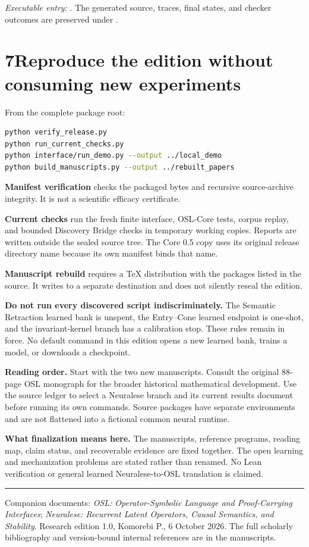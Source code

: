 \documentclass[11pt]{article}
\begin{document}
\textit{Executable entry:} . The generated source, traces, final states, and checker outcomes are preserved under .
\clearpage

\section*{7\quad Reproduce the edition without consuming new experiments}
From the complete package root:
\begin{lstlisting}[language=bash]
python verify_release.py
python run_current_checks.py
python interface/run_demo.py --output ../local_demo
python build_manuscripts.py --output ../rebuilt_papers
\end{lstlisting}
\textbf{Manifest verification} checks the packaged bytes and recursive source-archive integrity. It is not a scientific efficacy certificate.

\textbf{Current checks} run the fresh finite interface, OSL-Core tests, corpus replay, and bounded Discovery Bridge checks in temporary working copies. Reports are written outside the sealed source tree. The Core 0.5 copy uses its original release directory name because its own manifest binds that name.

\textbf{Manuscript rebuild} requires a TeX distribution with the packages listed in the source. It writes to a separate destination and does not silently reseal the edition.

\begin{scopebox}
\textbf{Do not run every discovered script indiscriminately.} The Semantic Retraction learned bank is unspent, the Entry--Cone learned endpoint is one-shot, and the invariant-kernel branch has a calibration stop. These rules remain in force. No default command in this edition opens a new learned bank, trains a model, or downloads a checkpoint.
\end{scopebox}
\textbf{Reading order.} Start with the two new manuscripts. Consult the original 88-page OSL monograph for the broader historical mathematical development. Use the source ledger to select a Neuralese branch and its current results document before running its own commands. Source packages have separate environments and are not flattened into a fictional common neural runtime.

\textbf{What finalization means here.} The manuscripts, reference programs, reading map, claim status, and recoverable evidence are fixed together. The open learning and mechanization problems are stated rather than renamed. No Lean verification or general learned Neuralese-to-OSL translation is claimed.

\vfill
\rule{\textwidth}{.4pt}
{\small Companion documents: \emph{OSL: Operator-Symbolic Language and Proof-Carrying Interfaces}; \emph{Neuralese: Recurrent Latent Operators, Causal Semantics, and Stability}. Research edition 1.0, Komorebi P., 6 October 2026. The full scholarly bibliography and version-bound internal references are in the manuscripts.}
\end{document}

